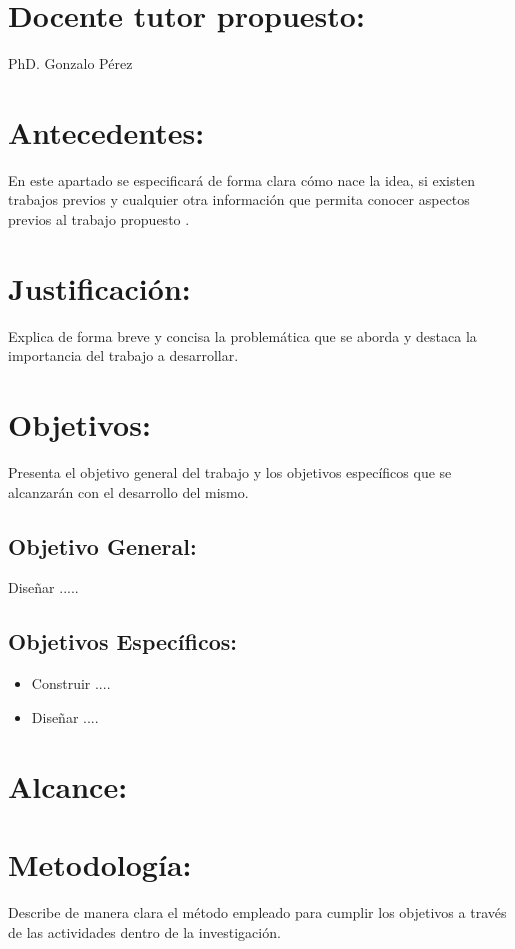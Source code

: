 \documentclass{article}
\begin{document}
\section{Docente tutor propuesto:   }
\begin{center}
PhD. Gonzalo Pérez
\end{center}
\section{Antecedentes:}
En este apartado se especificará de forma clara cómo nace la idea, si existen trabajos previos y cualquier otra información que permita conocer aspectos previos al trabajo propuesto  \cite{cataldi2000metodologia}.  

 \lipsum[1-1]
       
\section{Justificación:}   
Explica de forma breve y concisa la problemática que se aborda y destaca la importancia del trabajo a desarrollar. 
\section{Objetivos:}
Presenta el objetivo general del trabajo y los objetivos específicos que se alcanzarán con el desarrollo del mismo. 
\subsection*{Objetivo General:}
Diseñar .....
\subsection*{Objetivos Específicos:}

\begin{itemize}
    \item Construir ....
    \item Diseñar ....
\end{itemize}

\section{Alcance:}
\section{Metodología:}

Describe de manera clara el método empleado para cumplir los objetivos a través de las actividades dentro de la investigación. 
\end{document}
